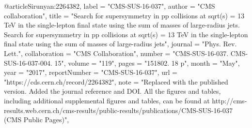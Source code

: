 @article{Sirunyan:2264382,
      label          = "CMS-SUS-16-037",
      author        = "{CMS collaboration}",
      title         = "{Search for supersymmetry in pp collisions at sqrt(s) = 13
                       TeV in the single-lepton final state using the sum of
                       masses of large-radius jets. Search for supersymmetry in pp
                       collisions at sqrt(s) = 13 TeV in the single-lepton final
                       state using the sum of masses of large-radius jets}",
      journal       = "Phys. Rev. Lett.",
      collaboration = "CMS Collaboration",
      number        = "CMS-SUS-16-037. CMS-SUS-16-037-004. 15",
      volume        = "119",
      pages         = "151802. 18 p",
      month         = "May",
      year          = "2017",
      reportNumber  = "CMS-SUS-16-037",
      url           = "https://cds.cern.ch/record/2264382",
      note          = "Replaced with the published version. Added the journal
                       reference and DOI. All the figures and tables, including
                       additional supplemental figures and tables, can be found at
                       http://cms-results.web.cern.ch/cms-results/public-results/publications/CMS-SUS-16-037
                       (CMS Public Pages)",
}


